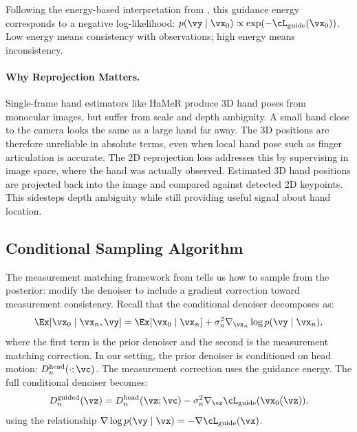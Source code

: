 \documentclass[../../book-main.tex]{subfiles}
\begin{document}
Following the energy-based interpretation from
, this guidance energy
corresponds to a negative log-likelihood: \(p(\vy \mid
\vx_{0}) \propto \exp(-\cL_{\mathrm{guide}}(\vx_{0}))\). Low
energy means consistency with observations; high energy means inconsistency.

\paragraph{Why Reprojection Matters.}
Single-frame hand estimators like HaMeR produce 3D hand poses from
monocular images, but suffer from scale and depth ambiguity. A small
hand close to the camera looks the same as a large hand far away. The
3D positions are therefore unreliable in absolute terms, even when
local hand pose such as finger articulation is accurate. The 2D reprojection loss addresses this by supervising in image
space, where the hand was actually observed. Estimated 3D hand
positions are projected back into the image and compared against
detected 2D keypoints. This sidesteps depth ambiguity while still
providing useful signal about hand location.

\subsection{Conditional Sampling Algorithm}
\label{sub:egoallo_sampling}

The measurement matching framework from
 tells us how to sample from
the posterior: modify the denoiser to include a gradient correction
toward measurement consistency. Recall that the conditional denoiser
decomposes as:
\begin{equation}
    \Ex[\vx_{0} \mid \vx_{n}, \vy]
    =
    \Ex[\vx_{0} \mid \vx_{n}]
    +
    \sigma_{n}^{2} \nabla_{\vx_{n}} \log p(\vy \mid \vx_{n}) ,
\end{equation}
where the first term is the prior denoiser and the second is the
measurement matching correction. In our setting, the prior denoiser is conditioned on head motion:
\(D_{n}^{\mathrm{head}}(\cdot; \vc)\). The measurement correction uses
the guidance energy. The full conditional denoiser becomes:
\begin{equation}
    D_{n}^{\mathrm{guided}}(\vz)
    =
    D_{n}^{\mathrm{head}}(\vz; \vc)
    -
    \sigma_{n}^{2}
    \nabla_{\vz}
    \cL_{\mathrm{guide}}(\vx_{0}(\vz)) ,
\end{equation}
using the relationship \(\nabla \log p(\vy \mid \vx) =
-\nabla \cL_{\mathrm{guide}}(\vx)\).
\end{document}
